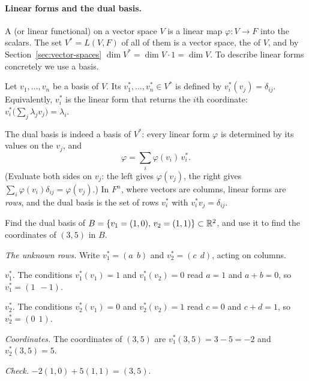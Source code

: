 \paragraph{Linear forms and the dual basis.}
A  (or linear functional) on a vector space $V$ is a linear map $\varphi:V\to F$ into the scalars. The set $V^*=L(V,F)$ of all of them is a vector space, the  of $V$, and by Section~\ref{sec:vector-spaces} $\dim V^*=\dim V\cdot1=\dim V$. To describe linear forms concretely we use a basis.

\begin{definition}\label{def:dualbasis}
  Let $v_1,\dots,v_n$ be a basis of $V$. Its  $v_1^*,\dots,v_n^*\in V^*$ is defined by $v_i^*(v_j)=\delta_{ij}$. Equivalently, $v_i^*$ is the linear form that returns the $i$th coordinate: $v_i^*\bigl(\sum_j\lambda_jv_j\bigr)=\lambda_i$.
\end{definition}

The dual basis is indeed a basis of $V^*$: every linear form $\varphi$ is determined by its values on the $v_j$, and
\[
  \varphi=\sum_i\varphi(v_i)\,v_i^* .
\]
(Evaluate both sides on $v_j$: the left gives $\varphi(v_j)$, the right gives $\sum_i\varphi(v_i)\delta_{ij}=\varphi(v_j)$.) In $F^n$, where vectors are columns, linear forms are \emph{rows}, and the dual basis is the set of rows $v_i^*$ with $v_i^*v_j=\delta_{ij}$.

\begin{example}\label{ex:dualbasis}
  Find the dual basis of $B=\{v_1=(1,0),\,v_2=(1,1)\}\subset\mathbb{R}^2$, and use it to find the coordinates of $(3,5)$ in $B$.
\end{example}
\begin{solution}
  \begin{steps}
    \item \emph{The unknown rows.} Write $v_1^*=(a\ \ b)$ and $v_2^*=(c\ \ d)$, acting on columns.
    \item \emph{$v_1^*$.} The conditions $v_1^*(v_1)=1$ and $v_1^*(v_2)=0$ read $a=1$ and $a+b=0$, so $v_1^*=(1\ \ -1)$.
    \item \emph{$v_2^*$.} The conditions $v_2^*(v_1)=0$ and $v_2^*(v_2)=1$ read $c=0$ and $c+d=1$, so $v_2^*=(0\ \ 1)$.
    \item \emph{Coordinates.} The coordinates of $(3,5)$ are $v_1^*(3,5)=3-5=-2$ and $v_2^*(3,5)=5$.
    \item \emph{Check.} $-2(1,0)+5(1,1)=(3,5)$.
  \end{steps}
\end{solution}

